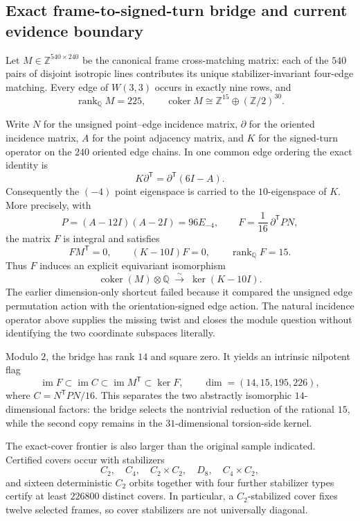 \subsection*{Exact frame-to-signed-turn bridge and current evidence boundary}

Let $M\in\mathbb Z^{540\times240}$ be the canonical frame
cross-matching matrix: each of the $540$ pairs of disjoint isotropic lines
contributes its unique stabilizer-invariant four-edge matching.  Every edge of
$W(3,3)$ occurs in exactly nine rows, and
\[
 \operatorname{rank}_{\mathbb Q}M=225,
 \qquad
 \operatorname{coker}M\cong\mathbb Z^{15}\oplus(\mathbb Z/2)^{30}.
\]

Write $N$ for the unsigned point--edge incidence matrix, $\partial$ for the
oriented incidence matrix, $A$ for the point adjacency matrix, and $K$ for the
signed-turn operator on the $240$ oriented edge chains.  In one common edge
ordering the exact identity is
\[
 K\partial^{\mathsf T}=\partial^{\mathsf T}(6I-A).
\]
Consequently the $(-4)$ point eigenspace is carried to the $10$-eigenspace of
$K$.  More precisely, with
\[
 P=(A-12I)(A-2I)=96E_{-4},
 \qquad
 F=\frac1{16}\,\partial^{\mathsf T}PN,
\]
the matrix $F$ is integral and satisfies
\[
 FM^{\mathsf T}=0,
 \qquad
 (K-10I)F=0,
 \qquad
 \operatorname{rank}_{\mathbb Q}F=15.
\]
Thus $F$ induces an explicit equivariant isomorphism
\[
 \operatorname{coker}(M)\otimes\mathbb Q
 \;\xrightarrow{\;\sim\;}\;
 \ker(K-10I).
\]
The earlier dimension-only shortcut failed because it compared the unsigned
edge permutation action with the orientation-signed edge action.  The natural
incidence operator above supplies the missing twist and closes the module
question without identifying the two coordinate subspaces literally.

Modulo $2$, the bridge has rank $14$ and square zero.  It yields an intrinsic
nilpotent flag
\[
 \operatorname{im}F\subset\operatorname{im}C
 \subset\operatorname{im}M^{\mathsf T}\subset\ker F,
 \qquad
 \dim=(14,15,195,226),
\]
where $C=N^{\mathsf T}PN/16$.  This separates the two abstractly isomorphic
$14$-dimensional factors: the bridge selects the nontrivial reduction of the
rational $15$, while the second copy remains in the $31$-dimensional
torsion-side kernel.

The exact-cover frontier is also larger than the original sample indicated.
Certified covers occur with stabilizers
\[
 C_2,\quad C_4,\quad C_2\times C_2,\quad D_8,\quad C_4\times C_2,
\]
and sixteen deterministic $C_2$ orbits together with four further stabilizer
types certify at least $226800$ distinct covers.  In particular, a
$C_2$-stabilized cover fixes twelve selected frames, so cover stabilizers are
not universally diagonal.

